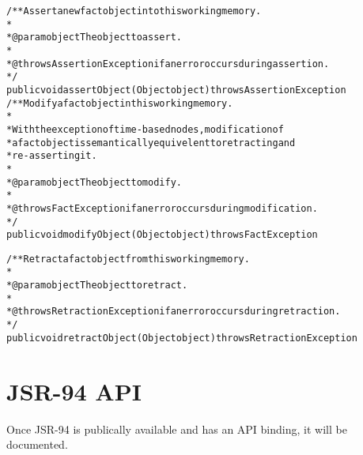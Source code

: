 \bigskip

\footnotesize
\begin{alltt}
/** Assert a new fact object into this working memory.
*
*  @param object The object to assert.
*
*  @throws AssertionException if an error occurs during assertion.
*/
public void assertObject(Object object) throws AssertionException
\newpage
/** Modify a fact object in this working memory.
*
*  With the exception of time-based nodes, modification of
*  a fact object is semantically equivelent to retracting and
*  re-asserting it.
*
*  @param object The object to modify.
*
*  @throws FactException if an error occurs during modification.
*/
public void modifyObject(Object object) throws FactException

/** Retract a fact object from this working memory.
*
*  @param object The object to retract.
*
*  @throws RetractionException if an error occurs during retraction.
*/
public void retractObject(Object object) throws RetractionException
\end{alltt}
\normalsize

\section{JSR-94 API}

Once JSR-94 is publically available and \drools{} has an API
binding, it will be documented.
